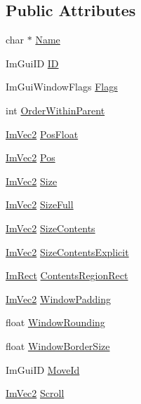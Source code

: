 \subsection*{Public Attributes}
\begin{DoxyCompactItemize}
\item 
char $\ast$ \hyperlink{struct_im_gui_window_ab44252eb7d02d3f38249f5bac605037c}{Name}
\item 
Im\+Gui\+ID \hyperlink{struct_im_gui_window_a5976b8d78bcc543ad7f23561f5cf0b8f}{ID}
\item 
Im\+Gui\+Window\+Flags \hyperlink{struct_im_gui_window_a7c29e810a533b9a647cce5d93d45057f}{Flags}
\item 
int \hyperlink{struct_im_gui_window_a81cb24c35445e1259367284701253c79}{Order\+Within\+Parent}
\item 
\hyperlink{struct_im_vec2}{Im\+Vec2} \hyperlink{struct_im_gui_window_a84170962470c8078195dad980cdfc1c0}{Pos\+Float}
\item 
\hyperlink{struct_im_vec2}{Im\+Vec2} \hyperlink{struct_im_gui_window_a1453f685401a44f76256fb54a4aac451}{Pos}
\item 
\hyperlink{struct_im_vec2}{Im\+Vec2} \hyperlink{struct_im_gui_window_a876e7aaf4cd824c8956238fba61387d5}{Size}
\item 
\hyperlink{struct_im_vec2}{Im\+Vec2} \hyperlink{struct_im_gui_window_ac3c7eb6b9cd556d56210cbb37caf0c74}{Size\+Full}
\item 
\hyperlink{struct_im_vec2}{Im\+Vec2} \hyperlink{struct_im_gui_window_a71097695729bf257ccaea824caf306a0}{Size\+Contents}
\item 
\hyperlink{struct_im_vec2}{Im\+Vec2} \hyperlink{struct_im_gui_window_a329d19a8805352b3a116e75e217d2155}{Size\+Contents\+Explicit}
\item 
\hyperlink{struct_im_rect}{Im\+Rect} \hyperlink{struct_im_gui_window_ac0d04b743eab132900c1ededc8eab9f6}{Contents\+Region\+Rect}
\item 
\hyperlink{struct_im_vec2}{Im\+Vec2} \hyperlink{struct_im_gui_window_a538d3d70ad8f71a4ec58a6a0560b2f02}{Window\+Padding}
\item 
float \hyperlink{struct_im_gui_window_a871ebbbfdf354600a3833c270d6e6ef4}{Window\+Rounding}
\item 
float \hyperlink{struct_im_gui_window_ad51248766b9a815ce20b0d11e13b42b0}{Window\+Border\+Size}
\item 
Im\+Gui\+ID \hyperlink{struct_im_gui_window_a680ac2168da85f59c35de8f0813224d6}{Move\+Id}
\item 
\hyperlink{struct_im_vec2}{Im\+Vec2} \hyperlink{struct_im_gui_window_abf20537560b9454a1e39667b8f9e7ff2}{Scroll}

\end{DoxyCompactItemize}
